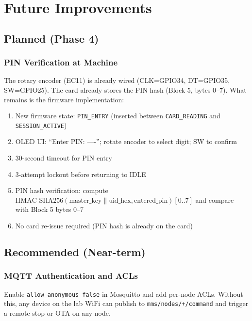 \chapter{Future Improvements}
\label{ch:future}

\section{Planned (Phase 4)}

\subsection{PIN Verification at Machine}

The rotary encoder (EC11) is already wired (CLK=GPIO34, DT=GPIO35, SW=GPIO25). The card already stores the PIN hash (Block 5, bytes 0--7). What remains is the firmware implementation:

\begin{enumerate}[leftmargin=1.5em]
    \item New firmware state: \texttt{PIN\_ENTRY} (inserted between \texttt{CARD\_READING} and \texttt{SESSION\_ACTIVE})
    \item OLED UI: ``Enter PIN: ----''; rotate encoder to select digit; SW to confirm
    \item 30-second timeout for PIN entry
    \item 3-attempt lockout before returning to IDLE
    \item PIN hash verification: compute $\text{HMAC-SHA256}(\text{master\_key}\|\text{uid\_hex}, \text{entered\_pin})[0..7]$ and compare with Block 5 bytes 0--7
    \item No card re-issue required (PIN hash is already on the card)
\end{enumerate}

\section{Recommended (Near-term)}

\subsection{MQTT Authentication and ACLs}

Enable \texttt{allow\_anonymous false} in Mosquitto and add per-node ACLs. Without this, any device on the lab WiFi can publish to \texttt{mms/nodes/+/command} and trigger a remote stop or OTA on any node.

